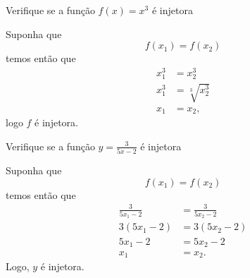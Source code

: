 \begin{example}
  Verifique se a função \(f(x) = x^3\) é injetora

  \solution
  Suponha que
  \[
    f(x_1)=f(x_2)
  \]
  temos então que
  \begin{align*}
    x_1^3 & = x_2^3 \\
    x_1^3 & = \sqrt[3]{x_2^3} \\
    x_1   & = x_2,
  \end{align*}
  logo $f$ é injetora.
\end{example}

\begin{example}
  Verifique se a função \(y= \frac{3}{5x-2}\) é injetora

  \solution
  Suponha que
  \[
    f(x_1)=f(x_2)
  \]
  temos então que
  \begin{align*}
   \frac{3}{5x_1-2} & = \frac{3}{5x_2-2} \\
   3(5x_1-2)        & = 3(5x_2-2) \\
   5x_1-2           & = 5x_2-2\\
   x_1              & = x_2.
  \end{align*}
  Logo, $y$ é injetora.
\end{example}
